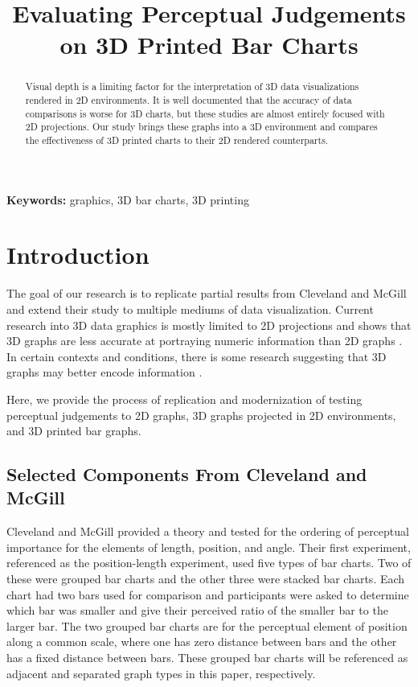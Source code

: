 \documentclass[10pt]{article}
\title{Evaluating Perceptual Judgements on 3D Printed Bar Charts}
\date{}
\begin{document}
%
\maketitle
\begin{abstract}
Visual depth is a limiting factor for the interpretation of 3D data visualizations rendered in 2D environments. 
It is well documented that the accuracy of data comparisons is worse for 3D charts, but these studies are almost entirely focused with 2D projections.
Our study brings these graphs into a 3D environment and compares the effectiveness of 3D printed charts to their 2D rendered counterparts.

\end{abstract}

{\bf Keywords:} graphics, 3D bar charts, 3D printing

\section{Introduction}

The goal of our research is to replicate partial results from Cleveland and McGill  and extend their study to multiple mediums of data visualization. 
Current research into 3D data graphics is mostly limited to 2D projections and shows that 3D graphs are less accurate at portraying numeric information than 2D graphs \cite{barfield_effects_1989,fisher_data_1997}.
In certain contexts and conditions, there is some research suggesting that 3D graphs may better encode information \cite{brath_3d_2014}. 

Here, we provide the process of replication and modernization of testing perceptual judgements to 2D graphs, 3D graphs projected in 2D environments, and 3D printed bar graphs.

\subsection{Selected Components From Cleveland and McGill}

Cleveland and McGill provided a theory and tested for the ordering of perceptual importance for the elements of length, position, and angle. 
Their first experiment, referenced as the position-length experiment, used five types of bar charts.
Two of these were grouped bar charts and the other three were stacked bar charts.
Each chart had two bars used for comparison and participants were asked to determine which bar was smaller and give their perceived ratio of the smaller bar to the larger bar.
The two grouped bar charts are for the perceptual element of position along a common scale, where one has zero distance between bars and the other has a fixed distance between bars.
These grouped bar charts will be referenced as adjacent and separated graph types in this paper, respectively.
\end{document}
